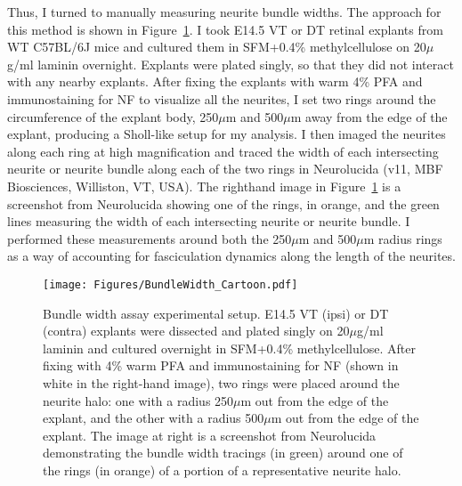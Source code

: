 Thus, I turned to manually measuring neurite bundle widths.
The approach for this method is shown in Figure~\ref{Figures/BundleWidth_Cartoon}.
I took E14.5 VT or DT retinal explants from WT C57BL/6J mice and cultured them in SFM+0.4\% methylcellulose on 20$\mu$g/ml laminin overnight.
Explants were plated singly, so that they did not interact with any nearby explants.
After fixing the explants with warm 4\% PFA and immunostaining for NF to visualize all the neurites, I set two rings around the circumference of the explant body, 250$\mu$m and 500$\mu$m away from the edge of the explant, producing a Sholl-like setup for my analysis.
I then imaged the neurites along each ring at high magnification and traced the width of each intersecting neurite or neurite bundle along each of the two rings in Neurolucida (v11, MBF Biosciences, Williston, VT, USA).
The righthand image in Figure~\ref{Figures/BundleWidth_Cartoon} is a screenshot from Neurolucida showing one of the rings, in orange, and the green lines measuring the width of each intersecting neurite or neurite bundle.
I performed these measurements around both the 250$\mu$m and 500$\mu$m radius rings as a way of accounting for fasciculation dynamics along the length of the neurites.
\begin{figure}[hbtp]
    \begin{center}
        \texttt{[image: Figures/BundleWidth\_Cartoon.pdf]}
        \caption[Bundle width assay experimental setup.]
        {Bundle width assay experimental setup.
		E14.5 VT (ipsi) or DT (contra) explants were dissected and plated singly on 20$\mu$g/ml laminin and cultured overnight in SFM+0.4\% methylcellulose.
		After fixing with 4\% warm PFA and immunostaining for NF (shown in white in the right-hand image), two rings were placed around the neurite halo: one with a radius 250$\mu$m out from the edge of the explant, and the other with a radius 500$\mu$m out from the edge of the explant.
		The image at right is a screenshot from Neurolucida demonstrating the bundle width tracings (in green) around one of the rings (in orange) of a portion of a representative neurite halo.
		}
        \label{Figures/BundleWidth_Cartoon}
    \end{center}
\end{figure}

